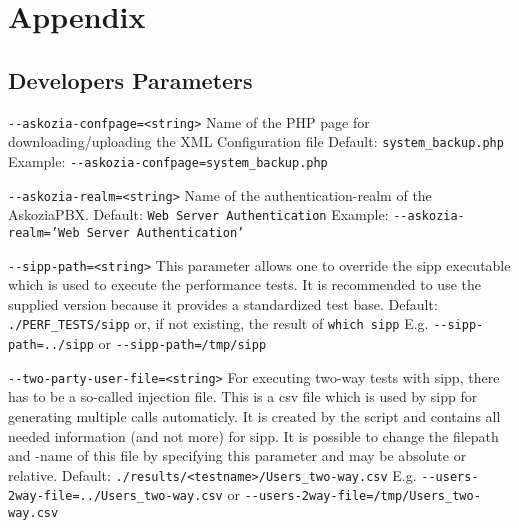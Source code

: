 \section{Appendix}
\label{sec:appendix}

\subsection{Developers Parameters}%
\begin {description}

\item {\texttt{-{}-askozia-confpage=<string>}} \newline
Name of the PHP page for downloading/uploading the XML Configuration file
\newline Default: \texttt{system\_backup.php}
\newline Example: \texttt{-{}-askozia-confpage=system\_backup.php}

\item {\texttt{-{}-askozia-realm=<string>}} \newline
Name of the authentication-realm of the AskoziaPBX.
\newline Default: \texttt{Web Server Authentication}
\newline Example: \texttt{-{}-askozia-realm='Web Server Authentication'}

\item {\texttt{-{}-sipp-path=<string>}} \newline
This parameter allows one to override the sipp executable which is used to execute the performance tests.
It is recommended to use the supplied version because it provides a standardized test base.
\newline Default: \texttt{./PERF\_TESTS/sipp} or, if not existing, the result of \texttt{which sipp}
\newline E.g. \texttt{-{}-sipp-path=../sipp} or \texttt{-{}-sipp-path=/tmp/sipp}

\item {\texttt{-{}-two-party-user-file=<string>}} \newline
For executing two-way tests with sipp, there has to be a so-called injection file.
This is a csv file which is used by sipp for generating multiple calls automaticly.
It is created by the script and contains all needed information (and not more)
for sipp. It is possible to change the filepath and -name of this file by specifying
this parameter and may be absolute or relative.
\newline Default: \texttt{./results/<testname>/Users\_two-way.csv}
\newline E.g. \texttt{-{}-users-2way-file=../Users\_two-way.csv}
\newline or \texttt{-{}-users-2way-file=/tmp/Users\_two-way.csv}


\end{description}
